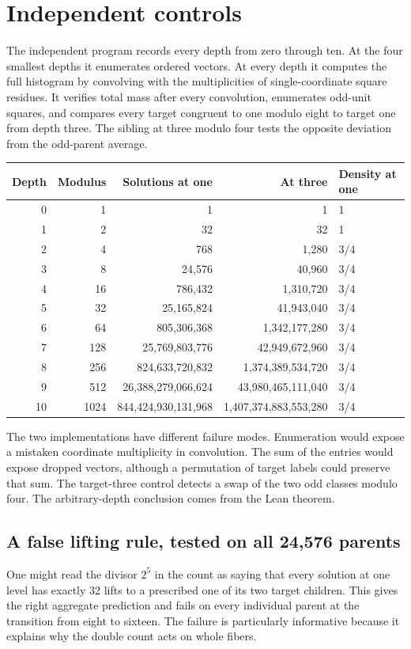 \documentclass[12pt,letterpaper]{article}
\begin{document}
\section{Independent controls}
The independent program records every depth from zero through ten. At the four smallest depths it enumerates ordered vectors. At every depth it computes the full histogram by convolving with the multiplicities of single-coordinate square residues. It verifies total mass after every convolution, enumerates odd-unit squares, and compares every target congruent to one modulo eight to target one from depth three. The sibling at three modulo four tests the opposite deviation from the odd-parent average.

\begin{center}\small\begin{tabular}{rrrrl}\toprule Depth & Modulus & Solutions at one & At three & Density at one\\\midrule
0 & 1 & 1 & 1 & 1\\
1 & 2 & 32 & 32 & 1\\
2 & 4 & 768 & 1,280 & 3/4\\
3 & 8 & 24,576 & 40,960 & 3/4\\
4 & 16 & 786,432 & 1,310,720 & 3/4\\
5 & 32 & 25,165,824 & 41,943,040 & 3/4\\
6 & 64 & 805,306,368 & 1,342,177,280 & 3/4\\
7 & 128 & 25,769,803,776 & 42,949,672,960 & 3/4\\
8 & 256 & 824,633,720,832 & 1,374,389,534,720 & 3/4\\
9 & 512 & 26,388,279,066,624 & 43,980,465,111,040 & 3/4\\
10 & 1024 & 844,424,930,131,968 & 1,407,374,883,553,280 & 3/4\\
\bottomrule\end{tabular}\end{center}

The two implementations have different failure modes. Enumeration would expose a mistaken coordinate multiplicity in convolution. The sum of the entries would expose dropped vectors, although a permutation of target labels could preserve that sum. The target-three control detects a swap of the two odd classes modulo four. The arbitrary-depth conclusion comes from the Lean theorem.
\subsection{A false lifting rule, tested on all 24,576 parents}
One might read the divisor $2^5$ in the count as saying that every solution at one level has exactly 32 lifts to a prescribed one of its two target children. This gives the right aggregate prediction and fails on every individual parent at the transition from eight to sixteen. The failure is particularly informative because it explains why the double count acts on whole fibers.
\end{document}
